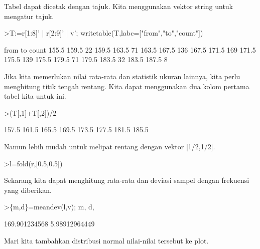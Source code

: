 \documentclass{article}
\begin{document}
\begin{eulernotebook}
\begin{eulercomment}
\begin{eulercomment}
\begin{eulercomment}
\begin{eulercomment}
\begin{eulercomment}
\begin{eulercomment}
\begin{eulercomment}
Tabel dapat dicetak dengan tajuk. Kita menggunakan vektor string untuk
mengatur tajuk.
\end{eulercomment}
\begin{eulerprompt}
>T:=r[1:8]' | r[2:9]' | v'; writetable(T,labc=["from","to","count"])
\end{eulerprompt}
\begin{euleroutput}
        from        to     count
       155.5     159.5        22
       159.5     163.5        71
       163.5     167.5       136
       167.5     171.5       169
       171.5     175.5       139
       175.5     179.5        71
       179.5     183.5        32
       183.5     187.5         8
\end{euleroutput}
\begin{eulercomment}
Jika kita memerlukan nilai rata-rata dan statistik ukuran lainnya,
kita perlu menghitung titik tengah rentang. Kita dapat menggunakan dua
kolom pertama tabel kita untuk ini.
\end{eulercomment}
\begin{eulerprompt}
>(T[,1]+T[,2])/2
\end{eulerprompt}
\begin{euleroutput}
                157.5 
                161.5 
                165.5 
                169.5 
                173.5 
                177.5 
                181.5 
                185.5 
\end{euleroutput}
\begin{eulercomment}
Namun lebih mudah untuk melipat rentang dengan vektor [1/2,1/2].
\end{eulercomment}
\begin{eulerprompt}
>l=fold(r,[0.5,0.5])
\end{eulerprompt}
\begin{euleroutput}
  [157.5,  161.5,  165.5,  169.5,  173.5,  177.5,  181.5,  185.5]
\end{euleroutput}
\begin{eulercomment}
Sekarang kita dapat menghitung rata-rata dan deviasi sampel dengan
frekuensi yang diberikan.
\end{eulercomment}
\begin{eulerprompt}
>\{m,d\}=meandev(l,v); m, d,
\end{eulerprompt}
\begin{euleroutput}
  169.901234568
  5.98912964449
\end{euleroutput}
\begin{eulercomment}
Mari kita tambahkan distribusi normal nilai-nilai tersebut ke plot.

\end{eulercomment}
\end{eulercomment}
\end{eulercomment}
\end{eulercomment}
\end{eulercomment}
\end{eulercomment}
\end{eulercomment}
\end{eulernotebook}
\end{document}
